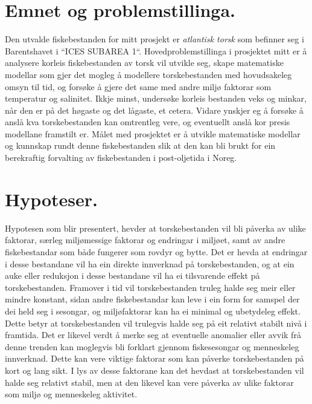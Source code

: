 \documentclass{report}
\begin{document}
\section{Emnet og problemstillinga.}
Den utvalde fiskebestanden for mitt prosjekt er \textit{atlantisk torsk} som befinner seg i Barentshavet i ``ICES SUBAREA 1``.
Hovedproblemstillinga i prosjektet mitt er å analysere korleis fiskebestanden av torsk vil utvikle seg, skape matematiske modellar som gjer det mogleg å modellere torskebestanden med hovudsakeleg omsyn til tid, og forsøke å gjere det same med andre miljø faktorar som temperatur og salinitet.
Ikkje minst, undersøke korleis bestanden veks og minkar, når den er på det høgaste og det lågaste, et cetera.
Vidare ynskjer eg å forsøke å anslå kva torskebestanden kan omtrentleg vere, og eventuellt anslå kor presis modellane framstilt er.
Målet med prosjektet er å utvikle matematiske modellar og kunnskap rundt denne fiskebestanden slik at den kan bli brukt for ein berekraftig forvalting av fiskebestanden i post-oljetida i Noreg.
\section{Hypoteser.}
Hypotesen som blir presentert, hevder at torskebestanden vil bli påverka av ulike faktorar, særleg miljømessige faktorar og endringar i miljøet, samt av andre fiskebestandar som både fungerer som rovdyr og bytte. Det er hevda at endringar i desse bestandane vil ha ein direkte innverknad på torskebestanden, og at ein auke eller reduksjon i desse bestandane vil ha ei tilsvarende effekt på torskebestanden.
Framover i tid vil torskebestanden truleg halde seg meir eller mindre konstant, sidan andre fiskebestandar kan leve i ein form for samspel der dei held seg i sesongar, og miljøfaktorar kan ha ei minimal og ubetydeleg effekt. Dette betyr at torskebestanden vil trulegvis halde seg på eit relativt stabilt nivå i framtida.
Det er likevel verdt å merke seg at eventuelle anomalier eller avvik frå denne trenden kan moglegvis bli forklart gjennom fiskesesongar og menneskeleg innverknad. Dette kan vere viktige faktorar som kan påverke torskebestanden på kort og lang sikt.
I lys av desse faktorane kan det hevdast at torskebestanden vil halde seg relativt stabil, men at den likevel kan vere påverka av ulike faktorar som miljø og menneskeleg aktivitet.
\end{document}
